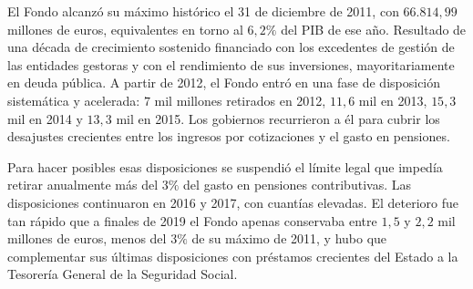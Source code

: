 \documentclass[10pt,a4paper]{article}
\begin{document}
El Fondo alcanzó su máximo histórico el 31 de diciembre de 2011, con $66{.}814,99$ millones de euros, equivalentes en torno al $6,2\%$ del PIB de ese año. Resultado de una década de crecimiento sostenido financiado con los excedentes de gestión de las entidades gestoras y con el rendimiento de sus inversiones, mayoritariamente en deuda pública. A partir de 2012, el Fondo entró en una fase de disposición sistemática y acelerada: $7$ mil millones retirados en 2012, $11,6$ mil en 2013, $15,3$ mil en 2014 y $13,3$ mil en 2015. Los gobiernos recurrieron a él para cubrir los desajustes crecientes entre los ingresos por cotizaciones y el gasto en pensiones.

Para hacer posibles esas disposiciones se suspendió el límite legal que impedía retirar anualmente más del $3\%$ del gasto en pensiones contributivas. Las disposiciones continuaron en 2016 y 2017, con cuantías elevadas. El deterioro fue tan rápido que a finales de 2019 el Fondo apenas conservaba entre $1,5$ y $2,2$ mil millones de euros, menos del $3\%$ de su máximo de 2011, y hubo que complementar sus últimas disposiciones con préstamos crecientes del Estado a la Tesorería General de la Seguridad Social. 
\end{document}
